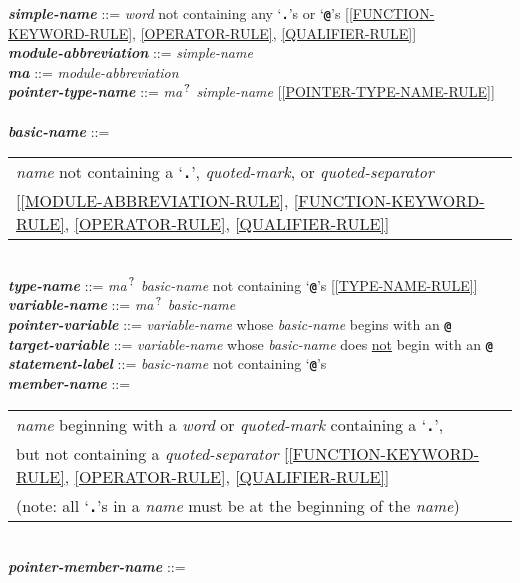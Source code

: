 \documentclass[12pt]{article}
\newcommand{\TT}[1]{{\tt \bfseries #1}}
\newcommand{\QMARK}{{$^{\,\mbox{\footnotesize ?}}$}}
\newcommand{\MA}{{\em ma}\QMARK}
\newcommand{\emkey}[1]{{\em \bfseries #1}}
\newenvironment{indpar}[1][0.3in]%
	{\begin{list}{}%
		     {\setlength{\itemsep}{0in}%
		      \setlength{\topsep}{0in}%
		      \setlength{\parsep}{1ex}%
		      \setlength{\labelwidth}{#1}%
		      \setlength{\leftmargin}{#1}%
		      \addtolength{\leftmargin}{\labelsep}}%
	 \item}%
	{\end{list}}
\begin{document}
\begin{indpar}
\emkey{simple-name} ::= {\em word} not containing any `\TT{.}'s or `\TT{@}'s
    [\ref{FUNCTION-KEYWORD-RULE},
     \ref{OPERATOR-RULE},
     \ref{QUALIFIER-RULE}] \\
\emkey{module-abbreviation}\label{MODULE-ABBREVIATION} ::= {\em simple-name} \\
\emkey{ma} ::= {\em module-abbreviation} \\
\emkey{pointer-type-name}\label{POINTER-TYPE-NAME} ::=
    \MA{} {\em simple-name}
    [\ref{POINTER-TYPE-NAME-RULE}] \\
\\[1ex]
\emkey{basic-name}\label{BASIC-NAME} ::=
	\begin{tabular}[t]{@{}l}
	{\em name} not containing a `\TT{.}', {\em quoted-mark}, or
	    {\em quoted-separator} \\{}
	[\ref{MODULE-ABBREVIATION-RULE},
	 \ref{FUNCTION-KEYWORD-RULE},
	 \ref{OPERATOR-RULE},
	 \ref{QUALIFIER-RULE}] \\
	\end{tabular} \\
\emkey{type-name}\label{TYPE-NAME} ::=
    \MA{} {\em basic-name} not containing `\TT{@}'s
	[\ref{TYPE-NAME-RULE}] \\
\emkey{variable-name}\label{VARIABLE-NAME} ::=
    \MA{} {\em basic-name} \\
\emkey{pointer-variable}\label{POINTER-VARIABLE} ::=
    {\em variable-name} whose {\em basic-name} begins with an \TT{@} \\
\emkey{target-variable}\label{TARGET-VARIABLE} ::=
    {\em variable-name} whose {\em basic-name} does \underline{not}
    begin with an \TT{@} \\
\emkey{statement-label} ::= {\em basic-name}
    \label{STATEMENT-LABEL} not containing `\TT{@}'s
\\[1ex]
\emkey{member-name}\label{MEMBER-NAME}
	::= \begin{tabular}[t]{@{}l@{}}
                        {\em name} beginning with a {\em word} or
			{\em quoted-mark} containing a `\TT{.}', \\
			but not containing a {\em quoted-separator}
			[\ref{FUNCTION-KEYWORD-RULE},
			 \ref{OPERATOR-RULE},
			 \ref{QUALIFIER-RULE}] \\
			(note: all `\TT{.}'s in a {\em name} must be at
			 the beginning of the {\em name})
			\end{tabular} \\
\emkey{pointer-member-name}\label{POINTER-MEMBER-NAME} ::=

\end{indpar}
\end{document}
